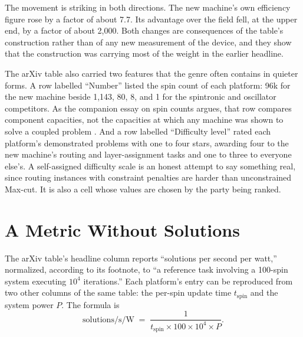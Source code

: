 \documentclass[11pt]{article}
\theoremstyle{definition}
\theoremstyle{remark}
\begin{document}
The movement is striking in both directions. The new machine's own efficiency figure rose by a factor of about 7.7. Its advantage over the field fell, at the upper end, by a factor of about 2,000. Both changes are consequences of the table's construction rather than of any new measurement of the device, and they show that the construction was carrying most of the weight in the earlier headline.

The arXiv table also carried two features that the genre often contains in quieter forms. A row labelled ``Number'' listed the spin count of each platform: 96k for the new machine beside 1,143, 80, 8, and 1 for the spintronic and oscillator competitors. As the companion essay on spin counts argues, that row compares component capacities, not the capacities at which any machine was shown to solve a coupled problem \cite{flyxion-spincount}. And a row labelled ``Difficulty level'' rated each platform's demonstrated problems with one to four stars, awarding four to the new machine's routing and layer-assignment tasks and one to three to everyone else's. A self-assigned difficulty scale is an honest attempt to say something real, since routing instances with constraint penalties are harder than unconstrained Max-cut. It is also a cell whose values are chosen by the party being ranked.

\section{A Metric Without Solutions}

The arXiv table's headline column reports ``solutions per second per watt,'' normalized, according to its footnote, to ``a reference task involving a 100-spin system executing $10^4$ iterations.'' Each platform's entry can be reproduced from two other columns of the same table: the per-spin update time $t_{\mathrm{spin}}$ and the system power $P$. The formula is
\begin{equation}
\text{solutions/s/W} \;=\; \frac{1}{t_{\mathrm{spin}} \times 100 \times 10^4 \times P}.
\label{eq:formula}
\end{equation}
\end{document}
